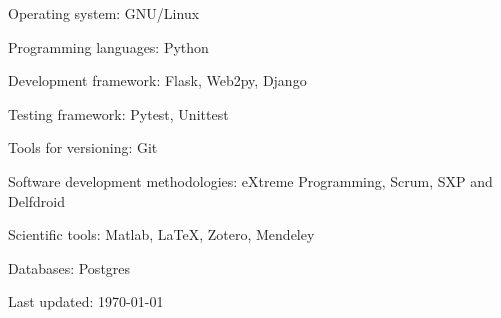 \documentclass[letterpaper]{article}
\def\footerlink{}
\renewenvironment{itemize}{
  \begin{list}{}{
    \setlength{\leftmargin}{1.5em}
  }
}{
  \end{list}
}
\begin{document}
\begin{itemize}
	\item Operating system: GNU/Linux
	\item Programming languages: Python
	\item Development framework: Flask, Web2py, Django
	\item Testing framework: Pytest, Unittest
	\item Tools for versioning: Git
	\item Software development methodologies: eXtreme Programming, Scrum, SXP and Delfdroid
	\item Scientific tools: Matlab, \LaTeX{}, Zotero, Mendeley
	\item Databases: Postgres
\end{itemize}


\bigskip

\begin{center}
  \begin{footnotesize}
    Last updated: \today \\
    \href{\footerlink}{\texttt{\footerlink}}
  \end{footnotesize}
\end{center}
\end{document}
